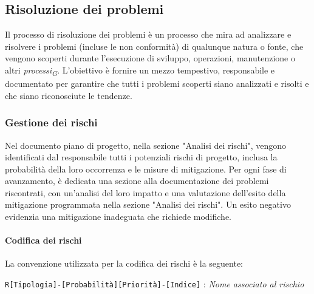\subsection{Risoluzione dei problemi}
Il processo di risoluzione dei problemi è un processo che mira ad analizzare e risolvere i problemi (incluse le non conformità) di qualunque natura o fonte, che vengono scoperti durante l'esecuzione di sviluppo, operazioni, manutenzione o altri \textit{processi}\textsubscript{\textit{G}}.
L'obiettivo è fornire un mezzo tempestivo, responsabile e documentato per garantire che tutti i problemi scoperti siano analizzati e risolti e che siano riconosciute le tendenze.

\subsubsection{Gestione dei rischi}
Nel documento piano di progetto, nella sezione "Analisi dei rischi", vengono identificati dal responsabile tutti i potenziali rischi di progetto, inclusa la probabilità della loro occorrenza e le misure di mitigazione. Per ogni fase di avanzamento, è dedicata una sezione alla documentazione dei problemi riscontrati, con un'analisi del loro impatto e una valutazione dell'esito della mitigazione programmata nella sezione "Analisi dei rischi". Un esito negativo evidenzia una mitigazione inadeguata che richiede modifiche.

\paragraph{Codifica dei rischi}
La convenzione utilizzata per la codifica dei rischi è la seguente: 
\begin{center}
    \texttt{R[Tipologia]-[Probabilità][Priorità]-[Indice]} : \textit{Nome associato al rischio}
\end{center} 

